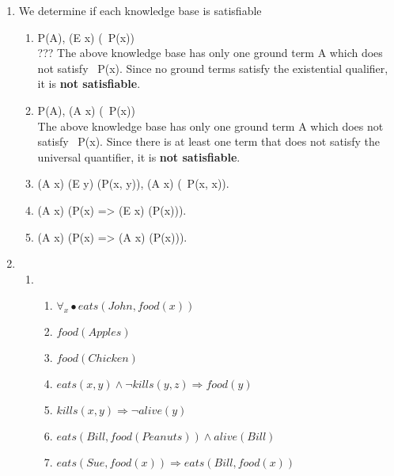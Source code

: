 \documentclass[12pt]{article}
\begin{document}
\begin{enumerate}
	\item We determine if each knowledge base is satisfiable
		\begin{enumerate}
			\item P(A), (E x) (~P(x)) \\
				??? The above knowledge base has only one ground term A which does not satisfy ~P(x). Since no ground terms satisfy the existential qualifier, it is \textbf{not satisfiable}.
			\item P(A), (A x) (~P(x)) \\
				The above knowledge base has only one ground term A which does not satisfy ~P(x). Since there is at least one term that does not satisfy the universal quantifier, it is \textbf{not satisfiable}.
			\item (A x) (E y) (P(x, y)), (A x) (~P(x, x)). \\
				
			\item (A x) (P(x) => (E x) (P(x))). \\
			\item (A x) (P(x) => (A x) (P(x))). \\
		\end{enumerate}
				
	\item 
		\begin{enumerate}
			\item
			\begin{enumerate}
				\item $\forall_x \bullet eats(John, food(x))$
				\item $food(Apples)$
				\item $food(Chicken)$
				\item $eats(x, y) \land \neg kills(y, z) \Rightarrow food(y)$
				\item $kills(x, y) \Rightarrow \neg alive(y)$
				\item $eats(Bill, food(Peanuts)) \land alive(Bill)$
				\item $eats(Sue, food(x)) \Rightarrow eats(Bill, food(x))$
			\end{enumerate}
		\end{enumerate}	
\end{enumerate}
\end{document}
